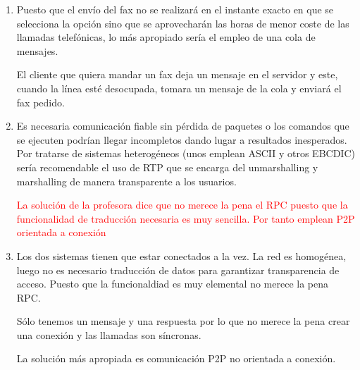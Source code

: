 \begin{problem}[14]
\begin{enumerate}
    \item

    Puesto que el envío del fax no se realizará en el instante exacto en que se selecciona la opción sino que se aprovecharán las horas de menor coste de las llamadas telefónicas, lo más apropiado sería el empleo de una cola de mensajes.

    El cliente que quiera mandar un fax deja un mensaje en el servidor y este, cuando la línea esté desocupada, tomara un mensaje de la cola y enviará el fax pedido.

    \item

    Es necesaria comunicación fiable sin pérdida de paquetes o los comandos que se ejecuten podrían llegar incompletos dando lugar a resultados inesperados. Por tratarse de sistemas heterogéneos (unos emplean ASCII y otros EBCDIC) sería recomendable el uso de RTP que se encarga del unmarshalling y marshalling de manera transparente a los usuarios.

    \textcolor{red}{La solución de la profesora dice que no merece la pena el RPC puesto que la funcionalidad de traducción necesaria es muy sencilla. Por tanto emplean P2P orientada a conexión}

    \item

   Los dos sistemas tienen que estar conectados a la vez. La red es homogénea, luego no es necesario traducción de datos para garantizar transparencia de acceso.
   Puesto que la funcionaldiad es muy elemental no merece la pena RPC.

   Sólo tenemos un mensaje y una respuesta por lo que no merece la pena crear
   una conexión y las llamadas son síncronas.

  La solución más apropiada es comunicación P2P no orientada a conexión.

    \end{enumerate}

    \end{problem}



